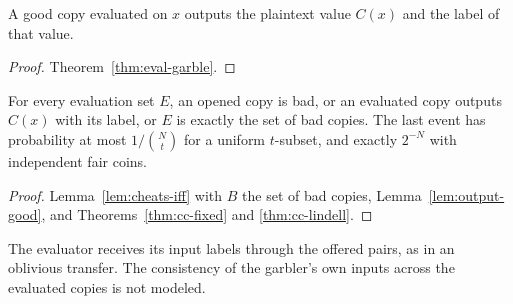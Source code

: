 \begin{lemma}
  \label{lem:output-good}
  \leanok
  A good copy evaluated on $x$ outputs the plaintext value $C(x)$ and the label of that value.
\end{lemma}

\begin{proof}
  \leanok
  Theorem~\ref{thm:eval-garble}.
\end{proof}

\begin{theorem}
  \label{thm:caught-or-correct}
  \leanok
  For every evaluation set $E$, an opened copy is bad, or an evaluated copy outputs $C(x)$ with
  its label, or $E$ is exactly the set of bad copies. The last event has probability at most
  $1/\binom{N}{t}$ for a uniform $t$-subset, and exactly $2^{-N}$ with independent fair coins.
\end{theorem}

\begin{proof}
  \leanok
  Lemma~\ref{lem:cheats-iff} with $B$ the set of bad copies, Lemma~\ref{lem:output-good}, and
  Theorems~\ref{thm:cc-fixed} and \ref{thm:cc-lindell}.
\end{proof}

\begin{remark}
  The evaluator receives its input labels through the offered pairs, as in an oblivious transfer.
  The consistency of the garbler's own inputs across the evaluated copies is not modeled.
\end{remark}

